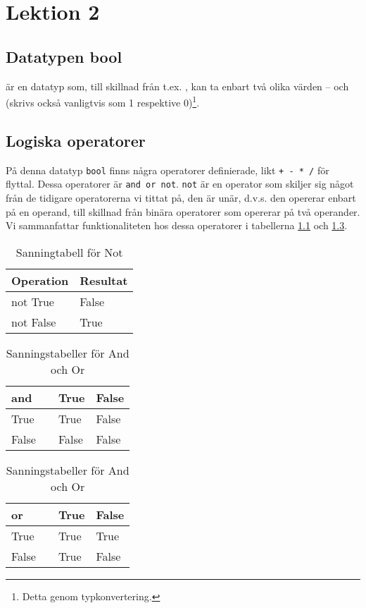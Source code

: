 \chapter{Lektion 2}

\section{Datatypen bool}

 är en datatyp som, till skillnad från t.ex. , kan ta
enbart två olika värden --  och  (skrivs också
vanligtvis som 1 respektive 0)\footnote{Detta genom typkonvertering.}.



\section{Logiska operatorer}

På denna datatyp \verb'bool' finns några operatorer definierade, likt
\verb'+ - * /' för flyttal. Dessa operatorer är \verb'and or not'. \verb'not'
är en operator som skiljer sig något från de tidigare operatorerna vi tittat
på, den är unär, d.v.s. den opererar enbart på en operand, till skillnad från
binära operatorer som opererar på två operander. Vi sammanfattar
funktionaliteten hos dessa operatorer i tabellerna \ref{tbl:not} och
\ref{tbl:andor}.

\begin{table}[h]
	\begin{tabular}{ll}
	Operation & Resultat \\
	\hline
	not True & False \\
	not False & True
	\end{tabular}
\label{tbl:not}
\caption{Sanningtabell för Not}
\end{table}

\begin{table}[h]
	\begin{tabular}{lcll}
	and & \vline & True & False \\
	\hline
	True & \vline & True & False \\
	False & \vline & False & False
	\end{tabular}
	\begin{tabular}{lcll}
	or & \vline & True & False \\
	\hline
	True & \vline & True & True \\
	False & \vline & True & False
	\end{tabular}
\label{tbl:andor}
\caption{Sanningstabeller för And och Or}
\end{table}


